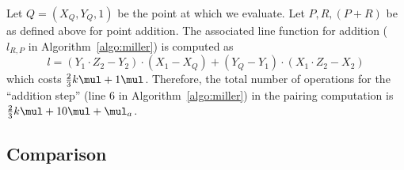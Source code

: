 Let $Q = (X_{Q},Y_{Q},1)$ be the point at which we evaluate.
Let $P,R,(P+R)$ be as defined above for point addition.
The associated line function for addition
($l_{R,P}$ in Algorithm~\ref{algo:miller})
is computed as
$$l = (Y_1 \cdot Z_2 - Y_2) \cdot (X_1 - X_{Q}) + (Y_{Q} - Y_1) \cdot (X_1 \cdot Z_2 - X_2) $$
which costs
$\frac{2}{3}k\mul + 1\mul$.
Therefore, the total number of operations for the ``addition step''
({line 6} in Algorithm~\ref{algo:miller}) in the pairing computation is
$\frac{2}{3}k\mul + 10\mul + \mul_a$.


\subsection{Comparison}


